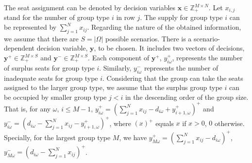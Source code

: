 The seat assignment can be denoted by decision variables $\mathbf{x}\in \mathbb{Z}_{+}^{M \times N}$. Let $x_{i,j}$ stand for the number of group type $i$ in row $j$. The supply for group type $i$ can be represented by $\sum_{j=1}^N x_{ij}$.
Regarding the nature of the obtained information, we assume that there are $S = |\Omega|$ possible scenarios. There is a scenario-dependent decision variable, $\mathbf{y}$, to be chosen. It includes two vectors of decisions, $\mathbf{y}^{+} \in \mathbb{Z}_{+}^{M \times S}$ and $\mathbf{y}^{-} \in \mathbb{Z}_{+}^{M \times S}$. Each component of $\mathbf{y}^{+}$, $y_{i \omega}^{+}$, represents the number of surplus seats for group type $i$. Similarly, $y_{i \omega}^{-}$ represents the number of inadequate seats for group type $i$.
Considering that the group can take the seats assigned to the larger group type, we assume that the surplus group type $i$ can be occupied by smaller group type $j<i$ in the descending order of the group size. That is, for any $\omega$, $i \leq M-1$, $y_{i \omega}^{+}=\left(\sum_{j=1}^N x_{ij}- d_{i \omega} + y_{i+1, \omega}^{+}\right)^{+}$ and $y_{i \omega}^{-}=\left(d_{i \omega}- \sum_{j=1}^N x_{ij} - y_{i+1, \omega}^{+} \right)^{+}$, where $(x)^{+}$ equals $x$ if $x>0$, $0$ otherwise. Specially, for the largest group type $M$, we have $y_{M \omega}^{+} = (\sum_{j=1}^N x_{ij} - d_{i \omega})^{+}$, $y_{M \omega}^{-} = (d_{i \omega}- \sum_{j=1}^N x_{ij})^{+}$.









